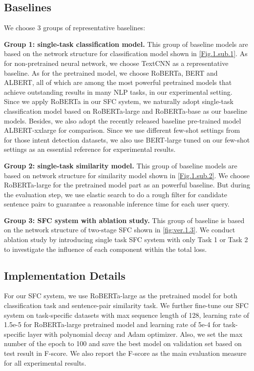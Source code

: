 \documentclass[letterpaper]{article} %
\begin{document}
  \subsection{Baselines}
  We choose 3 groups of representative baselines:

  \textbf{Group  1:  single-task  classification  model.} This group of baseline
  models  are  based  on the network structure for classification model shown in
  \ref{Fig.1.sub.1}.   As   for   non-pretrained   neural   network,  we  choose
  TextCNN \cite{kim2014convolutional}  as  a  representative baseline. As for the
  pretrained  model,  we choose RoBERTa, BERT and ALBERT, all of which are among
  the  most  powerful pretrained models that achieve outstanding results in many
  NLP  tasks,  in  our  experimental  setting. Since we apply RoBERTa in our SFC
  system,   we   naturally  adopt  single-task  classification  model  based  on
  RoBERTa-large  and RoBERTa-base as our baseline models. Besides, we also adopt
  the       recently       released       baseline       pre-trained       model
  ALBERT-xxlarge \cite{lan2019albert}  for  comparison.  Since  we  use different
  few-shot   settings   from    \cite{casanueva2020efficient}  for  those  intent
  detection  datasets,  we also use BERT-large tuned on our few-shot settings as
  an essential reference for experimental results.


  \textbf{Group  2: single-task similarity model.} This group of baseline models
  are   based   on   network   structure   for   similarity   model   shown   in
  \ref{Fig.1.sub.2}. We choose RoBERTa-large for the pretrained model part as an
  powerful baseline. But during the evaluation step, we use elastic search to do
  a  rough  filter  for  candidate  sentence  pairs  to  guarantee  a reasonable
  inference time for each user query.

  \textbf{Group  3:  SFC  system with ablation study.} This group of baseline is
  based  on  the network structure of two-stage SFC shown in \ref{fig:ver.1.3}. We
  conduct  ablation study by introducing single task SFC system with only Task 1
  or  Task  2  to  investigate  the influence of each component within the total
  loss.

  \subsection{Implementation Details}
  For  our  SFC  system,  we  use RoBERTa-large as the pretrained model for both
  classification  task  and  sentence-pair similarity task. We further fine-tune
  our  SFC  system  on  task-specific  datasets with max sequence length of 128,
  learning  rate  of 1.5e-5 for RoBERTa-large pretrained model and learning rate
  of  5e-4  for  task-specific  layer  with polynomial decay and Adam optimizer.
  Also,  we  set  the  max number of the epoch to 100 and save the best model on
  validation  set based on test result in F-score. We also report the F-score as
  the main evaluation measure for all experimental results.
\end{document}
